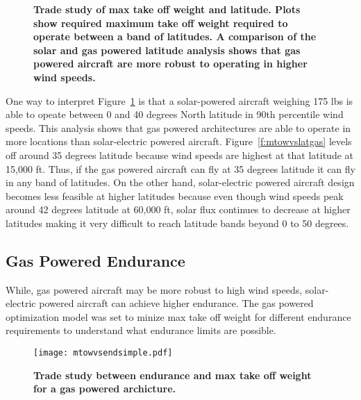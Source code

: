 \documentclass[]{aiaa-tc}%
\begin{document}
\begin{figure}[H]
 \begin{subfigmatrix}{2}%
 \end{subfigmatrix}
 \caption{\textbf{ Trade study of max take off weight and latitude. Plots show required maximum take off weight required to operate between a band of latitudes.   A comparison of the solar and gas powered latitude analysis shows that gas powered aircraft are more robust to operating in higher wind speeds. }}
 \label{f:latvsmtowtrade}
\end{figure}

One way to interpret Figure~\ref{f:latvsmtowtrade} is that a solar-powered aircraft weighing 175 lbs is able to opeate between 0 and 40 degrees North latitude in 90th percentile wind speeds.  
This analysis shows that gas powered architectures are able to operate in more locations than solar-electric powered aircraft.  
Figure~\ref{f:mtowvslatgas} levels off around 35 degrees latitude because wind speeds are highest at that latitude at 15,000 ft. 
Thus, if the gas powered aircraft can fly at 35 degrees latitude it can fly in any band of latitudes.  
On the other hand, solar-electric powered aircraft design becomes less feasible at higher latitudes because even though wind speeds peak around 42 degrees latitude at 60,000 ft, solar flux continues to decrease at higher latitudes making it very difficult to reach latitude bands beyond 0 to 50 degrees. 

\subsection{Gas Powered Endurance}

While, gas powered aircraft may be more robust to high wind speeds, solar-electric powered aircraft can achieve higher endurance. 
The gas powered optimization model was set to minize max take off weight for different endurance requirements to understand what endurance limits are possible. 

\begin{figure}[H]
	\begin{center}
	\texttt{[image: mtowvsendsimple.pdf]}
    \caption{ \textbf{ Trade study between endurance and max take off weight for a gas powered archicture. }}
	\label{f:mtowvsendsimple}
	\end{center}
\end{figure}
\end{document}
